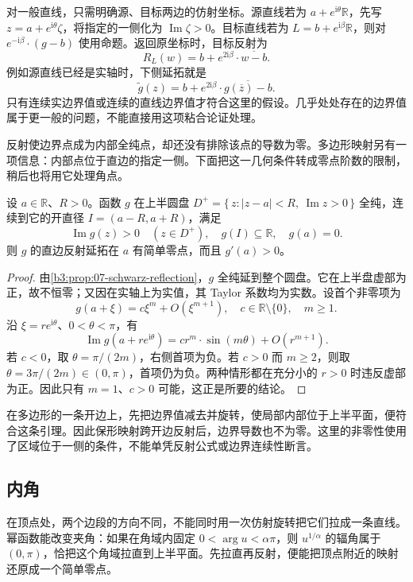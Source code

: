 对一般直线，只需明确源、目标两边的仿射坐标。源直线若为 \(a+e^{\mathrm{i}\theta}\mathbb R\)，先写 \(z=a+e^{\mathrm{i}\theta}\zeta\)，将指定的一侧化为 \(\operatorname{Im}\zeta>0\)。目标直线若为 \(L=b+e^{\mathrm{i}\beta}\mathbb R\)，则对 \(e^{-\mathrm{i}\beta}\cdot(g-b)\) 使用命题。返回原坐标时，目标反射为
\[
 R_L(w)=b+e^{2\mathrm{i}\beta}\cdot\overline{w-b}.
\]
例如源直线已经是实轴时，下侧延拓就是
\[
 \widetilde g(z)=b+e^{2\mathrm{i}\beta}\cdot
 \overline{g(\overline z)-b}.
\]
只有连续实边界值或连续的直线边界值才符合这里的假设。几乎处处存在的边界值属于更一般的问题，不能直接用这项粘合论证处理。

\ProseParagraphBreak
反射使边界点成为内部全纯点，却还没有排除该点的导数为零。多边形映射另有一项信息：内部点位于直边的指定一侧。下面把这一几何条件转成零点阶数的限制，稍后也将用它处理角点。

\begin{lemma}[半平面边界零点的阶数]\label{b3:lem:07-boundary-simple-zero}
设 \(a\in\mathbb R\)、\(R>0\)。函数 \(g\) 在上半圆盘 \(D^+=\{\,z:|z-a|<R,\ \operatorname{Im}z>0\,\}\) 全纯，连续到它的开直径 \(I=(a-R,a+R)\)，满足
\[
 \operatorname{Im}g(z)>0\quad(z\in D^+),\quad
 g(I)\subseteq\mathbb R,\quad g(a)=0.
\]
则 \(g\) 的直边反射延拓在 \(a\) 有简单零点，而且 \(g'(a)>0\)。
\end{lemma}
\begin{proof}
由\cref{b3:prop:07-schwarz-reflection}，\(g\) 全纯延到整个圆盘。它在上半盘虚部为正，故不恒零；又因在实轴上为实值，其 Taylor 系数均为实数。设首个非零项为
\[
 g(a+\xi)=c\xi^m+O(\xi^{m+1}),\quad
 c\in\mathbb R\setminus\{0\},\quad m\ge1.
\]
沿 \(\xi=re^{\mathrm{i}\theta}\)、\(0<\theta<\pi\)，有
\[
 \operatorname{Im}g(a+re^{\mathrm{i}\theta})
 =cr^m\cdot\sin(m\theta)+O(r^{m+1}).
\]
若 \(c<0\)，取 \(\theta=\pi/(2m)\)，右侧首项为负。若 \(c>0\) 而 \(m\ge2\)，则取 \(\theta=3\pi/(2m)\in(0,\pi)\)，首项仍为负。两种情形都在充分小的 \(r>0\) 时违反虚部为正。因此只有 \(m=1\)、\(c>0\) 可能，这正是所要的结论。
\end{proof}

在多边形的一条开边上，先把边界值减去并旋转，使局部内部位于上半平面，便符合这条引理。因此保形映射跨开边反射后，边界导数也不为零。这里的非零性使用了区域位于一侧的条件，不能单凭反射公式或边界连续性断言。

\subsection{内角}
\label{b3:subsec:070302}

在顶点处，两个边段的方向不同，不能同时用一次仿射旋转把它们拉成一条直线。幂函数能改变夹角：如果在角域内固定 \(0<\arg u<\alpha\pi\)，则 \(u^{1/\alpha}\) 的辐角属于 \((0,\pi)\)，恰把这个角域拉直到上半平面。先拉直再反射，便能把顶点附近的映射还原成一个简单零点。

